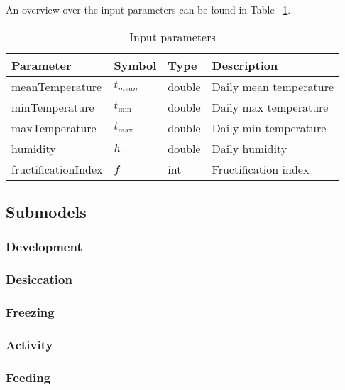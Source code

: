 \documentclass[a4paper, 11pt]{scrartcl}
\begin{document}
An overview over the input parameters can be found in Table ~\ref{input_parameters}.

\begin{table}[h!]
\caption{Input parameters}
\label{input_parameters}
\begin{tabularx}{\textwidth}{llll}
\toprule
\textbf{Parameter} & \textbf{Symbol} & \textbf{Type}     & \textbf{Description}       \\
\midrule
meanTemperature    & $t_{mean}$      & double            & Daily mean temperature     \\
minTemperature     & $t_{\min}$       & double            & Daily max temperature      \\
maxTemperature     & $t_{\max}$       & double            & Daily min temperature      \\
humidity           & $h$             & double            & Daily humidity             \\
\midrule
fructificationIndex & $f$            & int               & Fructification index       \\
\bottomrule
\end{tabularx}
\end{table}


\subsection{Submodels}

\subsubsection{Development}

\subsubsection{Desiccation}

\subsubsection{Freezing}

\subsubsection{Activity}

\subsubsection{Feeding}


\newpage
\printbibliography[heading = bibintoc, title = {Bibliography}]
\end{document}

